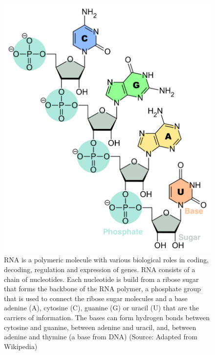 \documentclass[
  11pt,
]{book}
\begin{document}
\begin{figure}

{\centering \includegraphics[width=0.5\linewidth]{./figs/RNA-Nucleobases} 

}

\caption{RNA is a polymeric molecule with various biological roles in coding, decoding, regulation and expression of genes. RNA consists of a chain of nucleotides. Each nucleotide is build from a ribose sugar that forms the backbone of the RNA  polymer, a phosphate group that is used to connect the ribose sugar molecules and a base adenine (A), cytosine (C), guanine (G) or uracil (U) that are the carriers of information. The bases can form hydrogen bonds between cytosine and guanine, between adenine and uracil, and, between adenine and thymine (a base from DNA) (Source: Adapted from Wikipedia)}\label{fig:RNA}
\end{figure}
\end{document}

